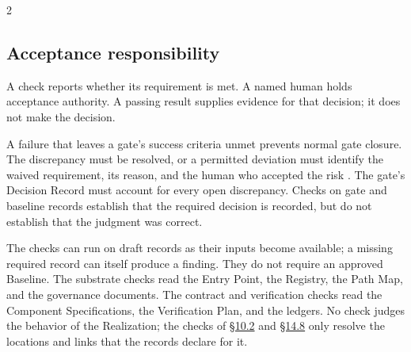 \begin{multicols}{2}
\subsection{Acceptance responsibility}

A check reports whether its requirement is met. A named human holds acceptance authority. A passing result supplies evidence for that decision; it does not make the decision.

A failure that leaves a gate's success criteria unmet prevents normal gate closure. The discrepancy must be resolved, or a permitted deviation must identify the waived requirement, its reason, and the human who accepted the risk \citep[Sections~\hyperlink{nss-1.5}{1.5}, \hyperlink{nss-8.3}{8.3}, and~\hyperlink{nss-8.4}{8.4}]{pss2026}. The gate's Decision Record must account for every open discrepancy. Checks on gate and baseline records establish that the required decision is recorded, but do not establish that the judgment was correct.

The checks can run on draft records as their inputs become available; a missing required record can itself produce a finding. They do not require an approved Baseline. The substrate checks read the Entry Point, the Registry, the Path Map, and the governance documents. The contract and verification checks read the Component Specifications, the Verification Plan, and the ledgers. No check judges the behavior of the Realization; the checks of \hyperlink{nss-10.2}{\S10.2} and \hyperlink{nss-14.8}{\S14.8} only resolve the locations and links that the records declare for it.
\end{multicols}
